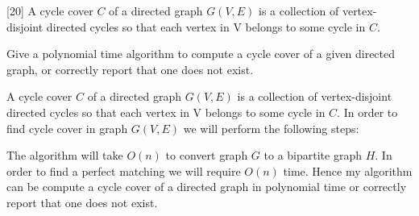 \documentclass[addpoints]{exam}
\begin{document}
\begin{questions}


[20]
A cycle cover $C$ of a directed graph $G(V,E)$ is a collection of
vertex-disjoint directed cycles so that each vertex in V belongs to
some cycle in $C$.

Give a polynomial time algorithm to compute a cycle cover of a given
directed graph, or correctly report that one does not exist.
\begin{solution}
A cycle cover $C$ of a directed graph $G(V,E)$ is a collection of
vertex-disjoint directed cycles so that each vertex in V belongs to
some cycle in $C$. In order to find cycle cover in graph $G(V,E)$ we will perform the following steps:


The algorithm will take $O(n)$ to convert graph $G$ to a bipartite graph $H$. In order to find a perfect matching we will require $O(n)$ time. Hence my algorithm can be compute a cycle cover of a directed graph in polynomial time or correctly report that one does not exist.


\end{solution}
\end{questions}
\end{document}

